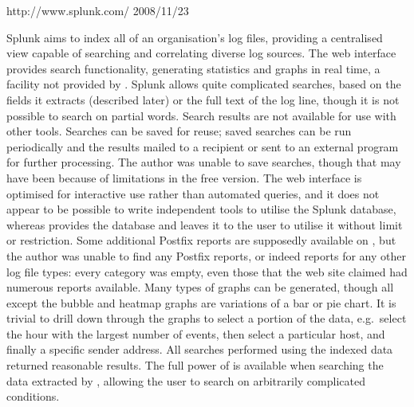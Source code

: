 \label{Splunk review}

{http://www.splunk.com/}
{2008/11/23}

Splunk aims to index all of an organisation's log files, providing a
centralised view capable of searching and correlating diverse log sources.
The web interface provides search functionality, generating statistics and
graphs in real time, a facility not provided by \parsername{}.  Splunk
allows quite complicated searches, based on the fields it extracts
(described later) or the full text of the log line, though it is not
possible to search on partial words.  Search results are not available for
use with other tools.  Searches can be saved for reuse; saved searches can
be run periodically and the results mailed to a recipient or sent to an
external program for further processing.  The author was unable to save
searches, though that may have been because of limitations in the free
version.  The web interface is optimised for interactive use rather than
automated queries, and it does not appear to be possible to write
independent tools to utilise the Splunk database, whereas \parsername{}
provides the database and leaves it to the user to utilise it without limit
or restriction.  Some additional Postfix reports are supposedly available
on , but the author
was unable to find any Postfix reports, or indeed reports for any other log
file types: every category was empty, even those that the web site claimed
had numerous reports available.  Many types of graphs can be generated,
though all except the bubble and heatmap graphs are variations of a bar or
pie chart.  It is trivial to drill down through the graphs to select a
portion of the data, e.g.\ select the hour with the largest number of
events, then select a particular host, and finally a specific sender
address.  All searches performed using the indexed data returned reasonable
results.  The full power of  is available when searching the
data extracted by \parsername{}, allowing the user to search on arbitrarily
complicated conditions.

